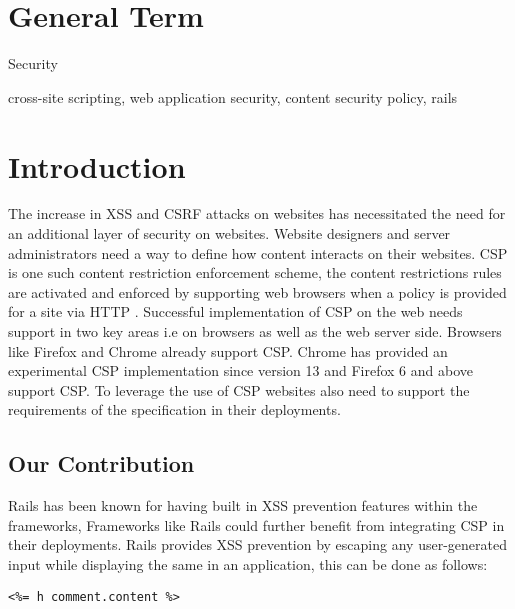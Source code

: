 \documentclass[10pt, conference, compsocconf]{IEEEtran}
\begin{document}
\section{General Term} %
\label{sec:general_term}
Security \\

\begin{IEEEkeywords}
cross-site scripting, web application security, content security policy, rails
\end{IEEEkeywords}

\IEEEpeerreviewmaketitle

\section{Introduction}
The increase in XSS and CSRF attacks on websites has necessitated the need for an additional layer of security on websites. Website designers and server administrators need a way to define how content interacts on their websites. CSP is one such content restriction enforcement scheme, the content restrictions rules are activated and enforced by supporting web browsers when a policy is provided for a site via HTTP \cite{IEEEhowto:stamm} . Successful implementation of CSP on the web needs support in two key areas i.e on browsers as well as the web server side. Browsers like Firefox and Chrome already support CSP. Chrome has provided an experimental CSP implementation since version 13 and Firefox 6 and above support CSP. To leverage the use of CSP websites also need to support the requirements of the specification in their deployments.  

\subsection{Our Contribution}
Rails has been known for having built in XSS prevention features within the frameworks, Frameworks like Rails could further benefit from integrating CSP in their deployments. Rails provides XSS prevention by escaping any user-generated input while displaying the same  in an application,  this can be done as follows:

\begin{lstlisting}
<%= h comment.content %>
\end{lstlisting}
\end{document}
